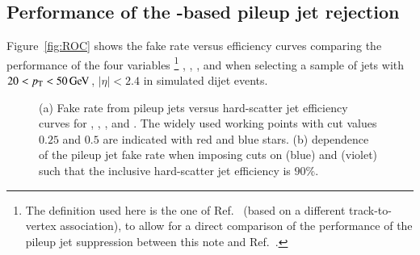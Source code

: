 \documentclass{atlasnote}
\begin{document}
\subsection{Performance of the \JVT-based pileup jet rejection}
Figure~\ref{fig:ROC} shows the fake rate versus efficiency curves comparing 
the performance of the four variables \JVF%
\footnote{The \JVF definition used here is the one of Ref.~\cite{ATLASConfNote:PUcorrection} (\ie based on a different track-to-vertex association), to 
allow for a direct comparison of the performance of the pileup jet suppression between this note and Ref.~\cite{ATLASConfNote:PUcorrection}.}
%
, \cJVF, \RpT, and \JVT when selecting a sample of 
jets with $20 < p_{\mathrm{T}} < 50\,\text{Ge\hspace{-.08em}V}$, $|\eta|<2.4$ 
in simulated dijet events.
\begin{figure}[!htbp]
  \centering
  \caption{(a) Fake rate from pileup jets versus hard-scatter jet efficiency curves for \JVF, \cJVF, \RpT, and \JVT. 
  The widely used \JVF working points with cut values $0.25$ and $0.5$ are indicated with red and blue stars. 
  (b) \NPV dependence of the pileup jet fake rate when imposing cuts on \JVT (blue) and \JVF (violet) such that the inclusive hard-scatter jet efficiency is $90\%$.
  } 
\end{figure}
\end{document}
